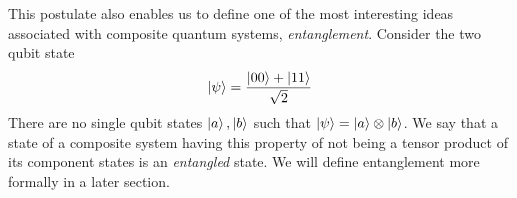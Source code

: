 This postulate also enables us to define one of the most interesting ideas associated with composite quantum systems, \textit{entanglement}. Consider the two qubit state 
\begin{equation}
    \ket{\psi}=\frac{\ket{00}+\ket{11}}{\sqrt{2}}
\end{equation}
There are no single qubit states $\ket{a}, \ket{b}$ such that $\ket{\psi}=\ket{a}\otimes \ket{b}$. We say that a state of a composite system having this property of not being a tensor product of its component states is an \textit{entangled} state. We will define entanglement more formally in a later section.